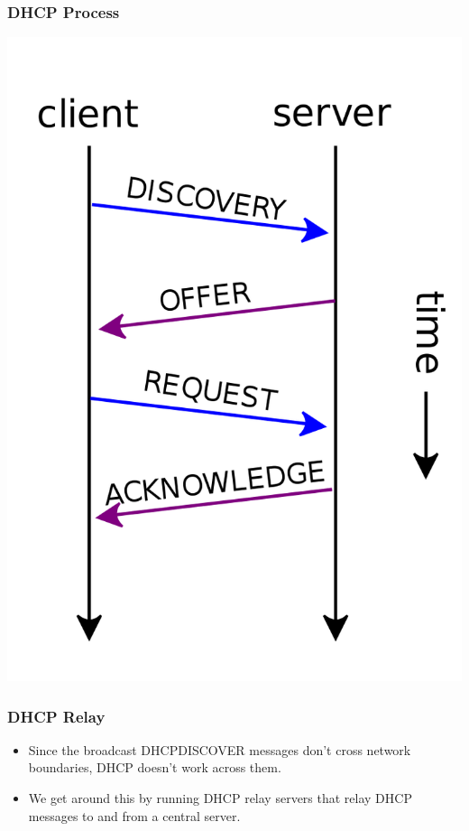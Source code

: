 \documentclass[10pt]{beamer}
\begin{document}
\begin{frame}
	\frametitle{DHCP Process}
	
	\includegraphics[scale=0.2]{DHCP_session.png}
	
\end{frame}




\begin{frame}
  \frametitle{DHCP Relay}
  \begin{itemize}
    \item Since the broadcast DHCPDISCOVER messages don't cross network
          boundaries, DHCP doesn't work across them.
    \item We get around this by running DHCP relay servers that relay
          DHCP messages to and from a central server.
  \end{itemize}  
\end{frame}
\end{document}
